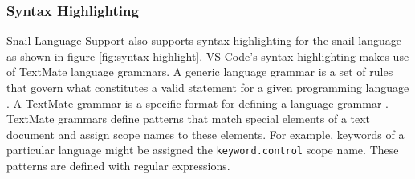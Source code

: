 \documentclass{article}
\begin{document}
\subsubsection{Syntax Highlighting}

Snail Language Support also supports syntax highlighting for the snail language as shown in figure \ref{fig:syntax-highlight}. VS Code's syntax highlighting makes use of TextMate language grammars. A generic language grammar is a set of rules that govern what constitutes a valid statement for a given programming language \cite{pgrandinetti_2019}. A TextMate grammar is a specific format for defining a language grammar \cite{MacroMates_2021a}. TextMate grammars define patterns that match special elements of a text document and assign scope names to these elements. For example, keywords of a particular language might be assigned the \lstinline{keyword.control} scope name. These patterns are defined with regular expressions. 
\end{document}
